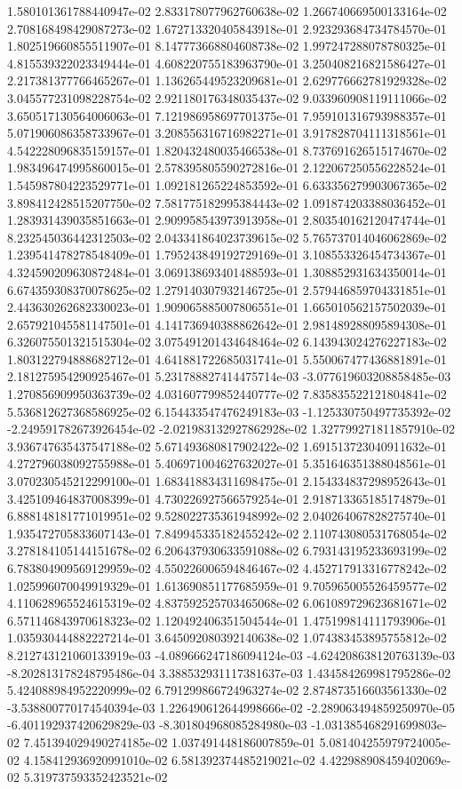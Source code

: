 1.580101361788440947e-02	2.833178077962760638e-02	1.266740669500133164e-02	2.708168498429087273e-02	1.672713320405843918e-01	2.923293684734784570e-01	1.802519660855511907e-01	8.147773668804608738e-02	1.997247288078780325e-01	4.815539322023349444e-01	4.608220755183963790e-01	3.250408216821586427e-01	2.217381377766465267e-01	1.136265449523209681e-01	2.629776662781929328e-02	3.045577231098228754e-02	2.921180176348035437e-02	9.033960908119111066e-02	3.650517130564006063e-01	7.121986958697701375e-01	7.959101316793988357e-01	5.071906086358733967e-01	3.208556316716982271e-01	3.917828704111318561e-01	4.542228096835159157e-01	1.820432480035466538e-01	8.737691626515174670e-02	1.983496474995860015e-01	2.578395805590272816e-01	2.122067250556228524e-01	1.545987804223529771e-01	1.092181265224853592e-01	6.633356279903067365e-02	3.898412428515207750e-02	7.581775182995384443e-02	1.091874203388036452e-01	1.283931439035851663e-01	2.909958543973913958e-01	2.803540162120474744e-01	8.232545036442312503e-02	2.043341864023739615e-02	5.765737014046062869e-02	1.239541478278548409e-01	1.795243849192729169e-01	3.108553326454734367e-01	4.324590209630872484e-01	3.069138693401488593e-01	1.308852931634350014e-01	6.674359308370078625e-02	1.279140307932146725e-01	2.579446859704331851e-01	2.443630262682330023e-01	1.909065885007806551e-01	1.665010562157502039e-01	2.657921045581147501e-01	4.141736940388862642e-01	2.981489288095894308e-01	6.326075501321515304e-02	3.075491201434648464e-02	6.143943024276227183e-02	1.803122794888682712e-01	4.641881722685031741e-01	5.550067477436881891e-01	2.181275954290925467e-01	5.231788827414475714e-03	-3.077619603208858485e-03	1.270856909950363739e-02	4.031607799852440777e-02	7.835835522121804841e-02	5.536812627368586925e-02	6.154433547476249183e-03	-1.125330750497735392e-02	-2.249591782673926454e-02	-2.021983132927862928e-02	1.327799271811857910e-02	3.936747635437547188e-02	5.671493680817902422e-02	1.691513723040911632e-01	4.272796038092755988e-01	5.406971004627632027e-01	5.351646351388048561e-01	3.070230545212299100e-01	1.683418834311698475e-01	2.154334837298952643e-01	3.425109464837008399e-01	4.730226927566579254e-01	2.918713365185174879e-01	6.888148181771019951e-02	9.528022735361948992e-02	2.040264067828275740e-01	1.935472705833607143e-01	7.849945335182455242e-02	2.110743080531768054e-02	3.278184105144151678e-02	6.206437930633591088e-02	6.793143195233693199e-02	6.783804909569129959e-02	4.550226006594846467e-02	4.452717913316778242e-02	1.025996070049919329e-01	1.613690851177685959e-01	9.705965005526459577e-02	4.110628965524615319e-02	4.837592525703465068e-02	6.061089729623681671e-02	6.571146843970618323e-02	1.120492406351504544e-01	1.475199814111793906e-01	1.035930444882227214e-01	3.645092080392140638e-02	1.074383453895755812e-02	8.212743121060133919e-03	-4.089666247186094124e-03	-4.624208638120763139e-03	-8.202813178248795486e-04	3.388532931117381637e-03	1.434584269981795286e-02	5.424088984952220999e-02	6.791299866724963274e-02	2.874873516603561330e-02	-3.538800770174540394e-03	1.226490612644998666e-02	-2.289063494859250970e-05	-6.401192937420629829e-03	-8.301804968085284980e-03	-1.031385468291699803e-02	7.451394029490274185e-02	1.037491448186007859e-01	5.081404255979724005e-02	4.158412936920991010e-02	6.581392374485219021e-02	4.422988908459402069e-02	5.319737593352423521e-02